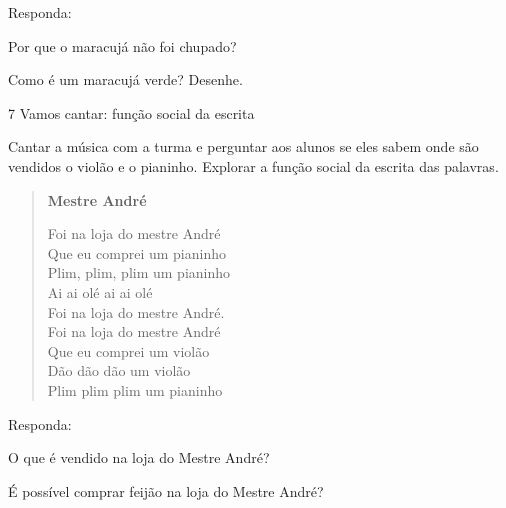 
Responda:

\begin{escolha}
\item Por que o maracujá não foi chupado?


\item Como é um maracujá verde? Desenhe.

\begin{mdframed}[linewidth=2pt,linecolor=salmao,roundcorner=10pt]
\vspace{5cm}
\end{mdframed}
\end{escolha}

\num{7} Vamos cantar: função social da escrita

{Cantar a música com a turma e perguntar aos alunos se eles sabem onde são vendidos o violão e o pianinho. Explorar a função social da escrita das palavras.}

\begin{verse}
\textbf{Mestre André}

Foi na loja do mestre André\\
Que eu comprei um pianinho\\
Plim, plim, plim um pianinho\\
Ai ai olé ai ai olé\\
Foi na loja do mestre André.\\
Foi na loja do mestre André\\
Que eu comprei um violão\\
Dão dão dão um violão\\
Plim plim plim um pianinho
\end{verse}


Responda:

\begin{escolha}
\item O que é vendido na loja do Mestre André?


\item É possível comprar feijão na loja do Mestre André?

\end{escolha}

